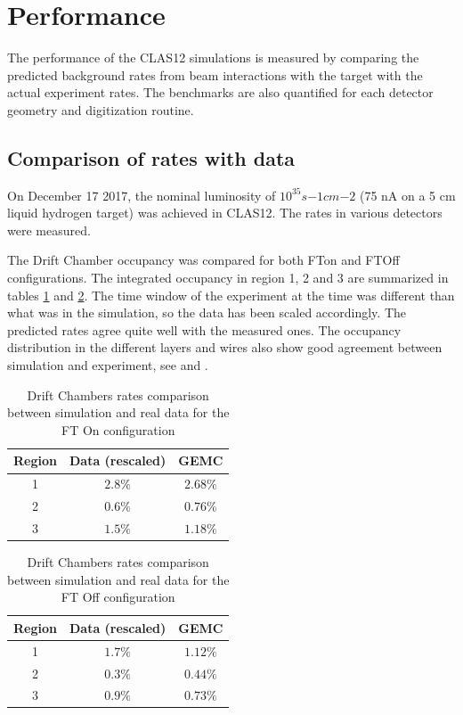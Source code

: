 \section{Performance}

The performance of the CLAS12 simulations is measured by comparing the predicted background rates from beam interactions
with the target with the actual experiment rates. The benchmarks are also quantified for each detector geometry and digitization routine.

\subsection{Comparison of rates with data}
On December 17 2017, the nominal luminosity of $10^{35} s{-1}cm{-2}$
(75 nA on a 5 cm liquid hydrogen target) was achieved in CLAS12.
The rates in various detectors were measured.

The Drift Chamber occupancy was compared for both FTon and FTOff configurations. The integrated occupancy
in region 1, 2 and 3 are summarized in tables \ref{tab:ftOnComparison} and \ref{tab:ftOffComparison}. The
time window of the experiment at the time was different than what was in the simulation, so the data has been scaled
accordingly. The predicted rates agree quite well with the measured ones. The occupancy distribution in the different layers
and wires also show good agreement between simulation and experiment, see  and  .

\begin{table}[h]
	\begin{center}
		\begin{tabular}{| c | c | c |}
			Region & Data (rescaled) &  GEMC \\
			\hline
			1 &  $2.8\%$  & $2.68\%$ \\
			2 &  $0.6\%$  & $0.76\%$ \\
			3 &  $1.5\%$  & $1.18\%$ \\
		\end{tabular}
	\end{center}
	\caption{Drift Chambers rates comparison between simulation and real data for the FT On configuration}\label{tab:ftOnComparison}
\end{table}

\begin{table}[h]
	\begin{center}
		\begin{tabular}{| c | c | c |}
			Region & Data (rescaled) &  GEMC \\
			\hline
			1 &  $1.7\%$  & $1.12\%$ \\
			2 &  $0.3\%$  & $0.44\%$ \\
			3 &  $0.9\%$  & $0.73\%$ \\
		\end{tabular}
	\end{center}
	\caption{Drift Chambers rates comparison between simulation and real data for the FT Off configuration}\label{tab:ftOffComparison}
\end{table}



